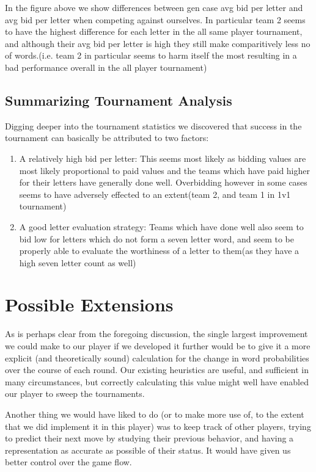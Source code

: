 \documentclass[11pt]{article}
\begin{document}
In the figure above we show differences between gen case avg bid per letter and avg bid per letter when competing against ourselves. In particular team 2 seems to have the highest difference for each letter in the all same player tournament, and although their avg bid per letter is high they still make comparitively less no of words.(i.e. team 2 in particular seems to harm itself the most resulting in a bad performance overall in the all player tournament)
	\subsection{Summarizing Tournament Analysis}
		
	Digging deeper into the tournament statistics we discovered that success in the tournament can basically be attributed to two factors:

	\begin{enumerate}
	\item{} A relatively high bid per letter: This seems most likely as bidding values are most likely proportional to paid values and the teams which have paid higher for their letters have generally done well. Overbidding however in some cases seems to have adversely effected to an extent(team 2, and team 1 in 1v1 tournament)
	\item{} A good letter evaluation strategy: Teams which have done well also seem to bid low for letters which do not form a seven letter word, and seem to be properly able to evaluate the worthiness of a letter to them(as they have a high seven letter count as well)
\end{enumerate}



\section{Possible Extensions}

As is perhaps clear from the foregoing discussion, the single largest improvement we could make to our player if we developed it further would be to give it a more explicit (and theoretically sound) calculation for the change in word probabilities over the course of each round.  Our existing heuristics are useful, and sufficient in many circumstances, but correctly calculating this value might well have enabled our player to sweep the tournaments.

Another thing we would have liked to do (or to make more use of, to the extent that we did implement it in this player) was to keep track of other players, trying to predict their next move by studying their previous behavior, and having a representation as accurate as possible of their status. It would have given us better control over the game flow.
\end{document}
